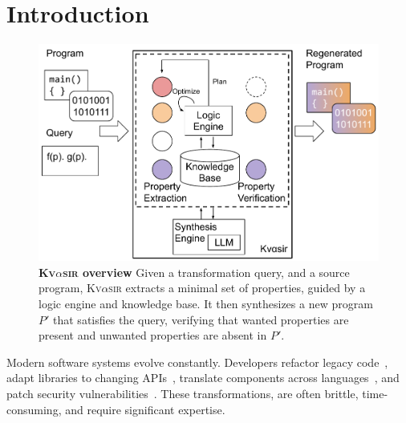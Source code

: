 \documentclass[nonacm,sigplan,review]{acmart}
\newcommand{\sys}{{\scshape Kv{$\alpha$}sir}\xspace}
\begin{document}
\section{Introduction}
\begin{figure}[t]
  \includegraphics[width=.9\columnwidth]{figs/kvasir_overview.pdf}
  \caption{\textbf{\sys overview}
Given a transformation query, and a source program, \sys extracts a minimal set
  of properties,
  guided by a logic engine and knowledge base.
  It then synthesizes a new program $P'$ that satisfies the query, verifying
  that wanted properties are present and unwanted properties are absent in $P'$.
}
  \label{fig:overview}
\end{figure}





Modern software systems evolve constantly.
Developers refactor legacy code~\cite{Fowler99,Mens04,facebook2010redesigns,dropbox2014syncengine},
adapt libraries to changing APIs~\cite{dig2005role,kula2017empiricalstudyimpactrefactoring},
translate components across languages~\cite{manzoor_cli_python,gaultier_rewrite_cpp},
and patch security vulnerabilities~\cite{ikegami2022userefactoringsecurityvulnerability,schneier2013security_vulnerabilities}.
These transformations, are often brittle, time-consuming, and require significant expertise.
\end{document}
